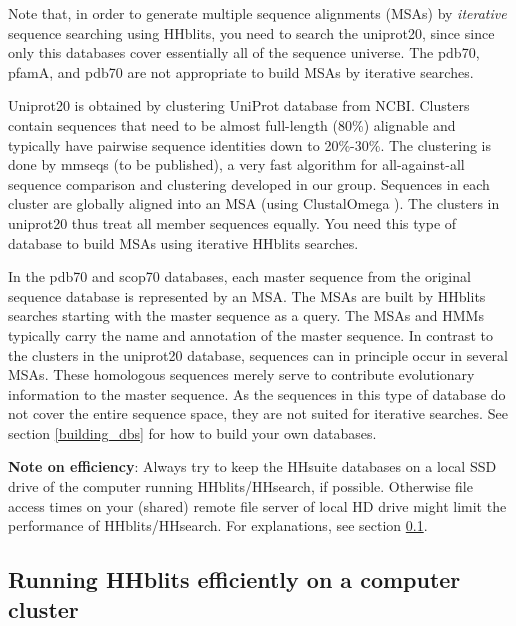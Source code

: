 \documentclass[11pt,a4paper]{article}
\begin{document}
Note that, in order to generate multiple sequence alignments (MSAs) by \emph{iterative} sequence searching using HHblits, you need to search the uniprot20, since since only this databases cover essentially all of the sequence 
universe. The pdb70, pfamA, and pdb70 are not appropriate to build MSAs by iterative searches.

Uniprot20 is obtained by clustering UniProt \cite{uniprot:2010} database from NCBI. Clusters contain sequences that need to be almost full-length (80\%) alignable and typically have pairwise sequence identities down to 20\%-30\%. The clustering is done by mmseqs (to be published), a very fast algorithm for all-against-all sequence comparison and clustering developed in our group. Sequences in each cluster are globally aligned into an MSA (using ClustalOmega \cite{Higgins:2011}). The clusters in uniprot20 thus treat all member sequences equally.
You need this type of database to build MSAs using iterative HHblits searches.

In the pdb70 and scop70 databases, each master sequence from the original sequence database is represented by an MSA. The MSAs are built by HHblits searches starting with the master sequence as a query. The MSAs and HMMs typically carry the name and annotation of the master sequence. In contrast to the clusters in the uniprot20 database, sequences can in principle occur in several MSAs. These homologous sequences merely serve to contribute evolutionary information to the master sequence. As the sequences in this type of database do not cover the entire sequence space, they are not suited for iterative searches. See section \ref{building_dbs} for how to build your own databases.

{\bf Note on efficiency}: Always try to keep the HHsuite databases on a local SSD drive of the computer running HHblits/HHsearch, if possible. Otherwise file access times on your (shared) remote file server of local HD drive might limit the performance of HHblits/HHsearch. For explanations, see section \ref{efficiency}.


\subsection{Running HHblits efficiently on a computer cluster} \label{efficiency}
\end{document}
